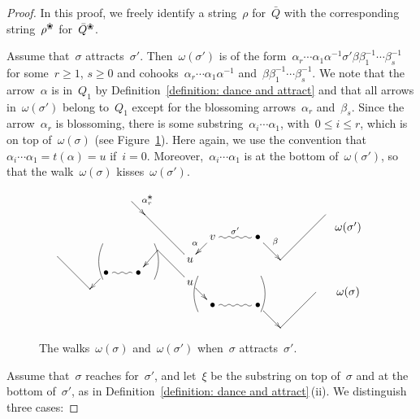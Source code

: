 \documentclass{amsart}
\theoremstyle{definition}
\newcommand{\blossom}{^\text{\ding{96}}} %
\begin{document}
\begin{proof}
In this proof, we freely identify a string~$\rho$ for~$\bar Q$ with the corresponding string~$\rho\blossom$ for~$\bar Q\blossom$.

Assume that~$\sigma$ attracts~$\sigma'$.
Then~$\omega(\sigma')$ is of the form~$\alpha_r\cdots\alpha_1\alpha^{-1}\sigma'\beta\beta_1^{-1}\cdots\beta_s^{-1}$ for some~${r \geq 1}$, ${s\geq 0}$ and cohooks~$\alpha_r\cdots\alpha_1\alpha^{-1}$ and~$\beta\beta_1^{-1}\cdots\beta_s^{-1}$.
We note that the arrow~$\alpha$ is in~$Q_1$ by Definition~\ref{definition: dance and attract} and that all arrows in~$\omega(\sigma')$ belong to~$Q_1$ except for the blossoming arrows~$\alpha_r$ and~$\beta_s$.
Since the arrow~$\alpha_r$ is blossoming, there is some substring~$\alpha_i\cdots\alpha_1$, with~$0\leq i \leq r$, which is on top of~$\omega(\sigma)$ (see Figure~\ref{fig: sigma attracts sigma'}).
Here again, we use the convention that~$\alpha_i\cdots\alpha_1 = t(\alpha)= u$ if~$i=0$. 
Moreover,~$\alpha_i\cdots\alpha_1$ is at the bottom of~$\omega(\sigma')$, so that the walk~$\omega(\sigma)$ kisses~$\omega(\sigma')$.

\begin{figure}[h]
 	\capstart
\[
\xy
%
(35,10)*+{\omega(\sigma')};
(-28,14)="lpeak";
(-14,0)*+{u}="-12";
(-7,7)*+{v}="-11";
(7,7)*+{\bullet}="11";
(14,0)="12";
(28,14)="rpeak";
%
(35,-10)*+{\omega(\sigma)};
(-55,1)="1";
(-45,-9)="2";
(-40,-4)*+{\bullet}="3";
(-30,-4)*+{\bullet}="4";
(-24,3)="5";
(-14,-7)*+{u}="u";
(-7,-14)*+{\bullet}="a";
(7,-14)*+{\bullet}="b";
(14,-21)="c";
(25,-10)="d";
%
{\ar^{\alpha_r\blossom} (-32,18);"lpeak"};
{\ar@{-} "lpeak";"-12"};
{\ar_{\alpha} "-11";"-12"};
{\ar@{~}^{\sigma'} "-11";"11"};
{\ar^{\beta} "11";"12"};
{\ar@{-} "12";"rpeak"};
%
{\ar@{-} "1";"2"};
{\ar "3";"2"};
{\ar@{~} "3";"4"};
{\ar "5";"4"};
{\ar@{-} "5";"u"};
{\ar "u";"a"};
{\ar@{~} "a";"b"};
{\ar "b";"c"};
{\ar@{-} "c";"d"};
%
{\ar@/_.3pc/@{-} (-11.5,-5);(-11.5,-16)};
{\ar@/^.3pc/@{-} (8,-5);(8,-16)};
%
{\ar@/_.3pc/@{-} (-41,5);(-41,-6)};
{\ar@/^.3pc/@{-} (-25,5);(-25,-6)};
%
\endxy
\]
    \caption{The walks~$\omega(\sigma)$ and~$\omega(\sigma')$ when~$\sigma$ attracts~$\sigma'$.}
    \label{fig: sigma attracts sigma'}
\end{figure}

Assume that~$\sigma$ reaches for~$\sigma'$, and let~$\xi$ be the substring on top of~$\sigma$ and at the bottom of~$\sigma'$, as in Definition~\ref{definition: dance and attract}\,(ii).
We distinguish three cases:


\end{proof}
\end{document}
